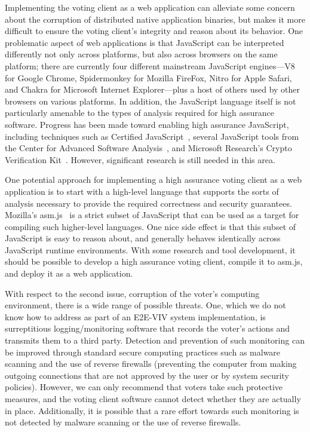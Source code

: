 Implementing the voting client as a web application can alleviate some
concern about the corruption of distributed native application
binaries, but makes it more difficult to ensure the voting client's
integrity and reason about its behavior. One problematic aspect of web
applications is that JavaScript can be interpreted differently not
only across platforms, but also across browsers on the same platform;
there are currently four different mainstream JavaScript engines---V8
for Google Chrome, Spidermonkey for Mozilla FireFox, Nitro for Apple
Safari, and Chakra for Microsoft Internet Explorer---plus a host of
others used by other browsers on various platforms. In addition, the
JavaScript language itself is not particularly amenable to the types
of analysis required for high assurance software. Progress has been
made toward enabling high assurance JavaScript, including techniques
such as Certified JavaScript~\cite{JSCert}, several JavaScript tools
from the Center for Advanced Software Analysis~\cite{CASATools}, and
Microsoft Research's Crypto Verification Kit~\cite{CVK}. However,
significant research is still needed in this area.

One potential approach for implementing a high assurance voting client
as a web application is to start with a high-level language that
supports the sorts of analysis necessary to provide the required
correctness and security guarantees.  Mozilla's asm.js~\cite{asm.js}
is a strict subset of JavaScript that can be used as a target for
compiling such higher-level languages. One nice side effect is that
this subset of JavaScript is easy to reason about, and generally
behaves identically across JavaScript runtime environments. With some
research and tool development, it should be possible to develop a high
assurance voting client, compile it to asm.js, and deploy it as a web
application.

With respect to the second issue, corruption of the voter's computing
environment, there is a wide range of possible threats. One, which we
do not know how to address as part of an E2E-VIV system
implementation, is surreptitious logging/monitoring software that
records the voter's actions and transmits them to a third
party. Detection and prevention of such monitoring can be improved
through standard secure computing practices such as malware scanning
and the use of reverse firewalls (preventing the computer from making
outgoing connections that are not approved by the user or by system
security policies). However, we can only recommend that voters take
such protective measures, and the voting client software cannot detect
whether they are actually in place. Additionally, it is possible that
a rare effort towards such monitoring is not detected by malware
scanning or the use of reverse firewalls.

